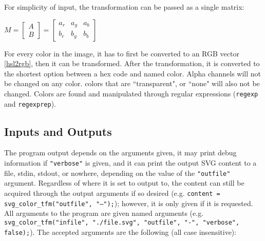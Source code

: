 \documentclass[12pt]{article}
\begin{document}
\noindent For simplicity of input, the transformation can be passed as a single matrix:

$M = \begin{bmatrix}
	A \\ B
\end{bmatrix} = \begin{bmatrix}
	a_r & a_g & a_b \\
	b_r & b_g & b_b
\end{bmatrix}$

\indent \indent For every color in the image, it has to first be converted to an RGB vector \ref{hsl2rgb}, then it can be transformed. After the transformation, it is converted to the shortest option between a hex code and named color. Alpha channels will not be changed on any color. colors that are ``transparent", or ``none" will also not be changed. Colors are found and manipulated through regular expressions (\textcolor{function}{\texttt{regexp}} and \textcolor{function}{\texttt{regexprep}}).


\subsection{Inputs and Outputs}

\indent \indent \indent The program output depends on the arguments given, it may print debug information if \texttt{"verbose"} is given, and it can print the output SVG content to a file, stdin, stdout, or nowhere, depending on the value of the \texttt{"outfile"} argument. Regardless of where it is set to output to, the content can still be acquired through the output arguments if so desired (e.g. \texttt{content = svg\_color\_tfm("outfile", "---");}); however, it is only given if it is requested. All arguments to the program are given named arguments (e.g. \texttt{svg\_color\_tfm("infile", "./file.svg", "outfile", "-", "verbose", false);}). The accepted arguments are the following (all case insensitive):
\end{document}

